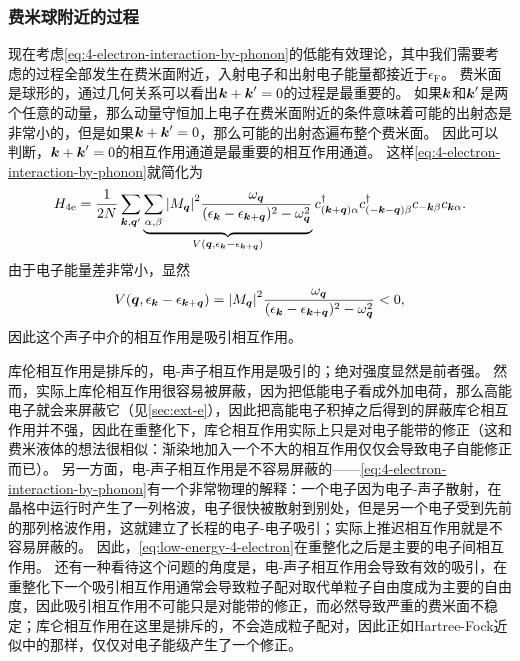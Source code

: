 \subsubsection{费米球附近的过程}

现在考虑\eqref{eq:4-electron-interaction-by-phonon}的低能有效理论，其中我们需要考虑的过程全部发生在费米面附近，入射电子和出射电子能量都接近于$\epsilon_\text{F}$。
费米面是球形的，通过几何关系可以看出$\vb*{k} + \vb*{k}' = 0$的过程是最重要的。
如果$\vb*{k}$和$\vb*{k}'$是两个任意的动量，那么动量守恒加上电子在费米面附近的条件意味着可能的出射态是非常小的，但是如果$\vb*{k} + \vb*{k}' = 0$，那么可能的出射态遍布整个费米面。
因此可以判断，$\vb*{k} + \vb*{k}' = 0$的相互作用通道是最重要的相互作用通道。
这样\eqref{eq:4-electron-interaction-by-phonon}就简化为
\begin{equation}
    {H}_{4\text{e}} = \frac{1}{2N} \sum_{\vb*{k}, \vb*{q}'} \underbrace{\sum_{\alpha, \beta} \abs{M_{\vb*{q}}}^2 \frac{\omega_{\vb*{q}}}{(\epsilon_{\vb*{k}} - \epsilon_{\vb*{k}+\vb*{q}})^2 - \omega_{\vb*{q}}^2}}_{V(\vb*{q}, \epsilon_{\vb*{k}} - \epsilon_{\vb*{k}+\vb*{q}})} {c}^\dagger_{(\vb*{k}+\vb*{q}) \alpha} {c}^\dagger_{(-\vb*{k}-\vb*{q}) \beta} {c}_{-\vb*{k} \beta} {c}_{\vb*{k} \alpha}.
    \label{eq:low-energy-4-electron}
\end{equation}
由于电子能量差非常小，显然
\[
    V(\vb*{q}, \epsilon_{\vb*{k}} - \epsilon_{\vb*{k}+\vb*{q}}) = \abs{M_{\vb*{q}}}^2 \frac{\omega_{\vb*{q}}}{(\epsilon_{\vb*{k}} - \epsilon_{\vb*{k}+\vb*{q}})^2 - \omega_{\vb*{q}}^2} < 0,
\]
因此这个声子中介的相互作用是吸引相互作用。

库伦相互作用是排斥的，电-声子相互作用是吸引的；绝对强度显然是前者强。
然而，实际上库伦相互作用很容易被屏蔽，因为把低能电子看成外加电荷，那么高能电子就会来屏蔽它（见\autoref{sec:ext-e}），因此把高能电子积掉之后得到的屏蔽库仑相互作用并不强，因此在重整化下，库仑相互作用实际上只是对电子能带的修正（这和费米液体的想法很相似：渐染地加入一个不大的相互作用仅仅会导致电子自能修正而已）。
另一方面，电-声子相互作用是不容易屏蔽的——\eqref{eq:4-electron-interaction-by-phonon}有一个非常物理的解释：一个电子因为电子-声子散射，在晶格中运行时产生了一列格波，电子很快被散射到别处，但是另一个电子受到先前的那列格波作用，这就建立了长程的电子-电子吸引；实际上推迟相互作用就是不容易屏蔽的。
因此，\eqref{eq:low-energy-4-electron}在重整化之后是主要的电子间相互作用。
还有一种看待这个问题的角度是，电-声子相互作用会导致有效的吸引，在重整化下一个吸引相互作用通常会导致粒子配对取代单粒子自由度成为主要的自由度，因此吸引相互作用不可能只是对能带的修正，而必然导致严重的费米面不稳定；库仑相互作用在这里是排斥的，不会造成粒子配对，因此正如Hartree-Fock近似中的那样，仅仅对电子能级产生了一个修正。

